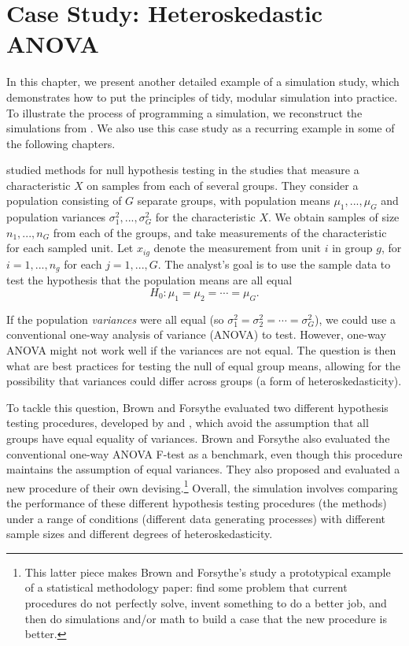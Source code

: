 \documentclass[
]{book}
\begin{document}
\chapter{Case Study: Heteroskedastic ANOVA}\label{case-ANOVA}

In this chapter, we present another detailed example of a simulation study, which demonstrates how to put the principles of tidy, modular simulation into practice.
To illustrate the process of programming a simulation, we reconstruct the simulations from \citet{brown1974SmallSampleBehavior}.
We also use this case study as a recurring example in some of the following chapters.

\citet{brown1974SmallSampleBehavior} studied methods for null hypothesis testing in the studies that measure a characteristic \(X\) on samples from each of several groups. They consider a population consisting of \(G\) separate groups, with population means \(\mu_1,...,\mu_G\) and population variances \(\sigma_1^2,...,\sigma_G^2\) for the characteristic \(X\).
We obtain samples of size \(n_1,...,n_G\) from each of the groups, and take measurements of the characteristic for each sampled unit.
Let \(x_{ig}\) denote the measurement from unit \(i\) in group \(g\), for \(i = 1,...,n_g\) for each \(j = 1,..., G\).
The analyst's goal is to use the sample data to test the hypothesis that the population means are all equal
\[
H_0: \mu_1 = \mu_2 = \cdots = \mu_G.
\]

If the population \emph{variances} were all equal (so \(\sigma_1^2 = \sigma_2^2 = \cdots = \sigma_G^2\)), we could use a conventional one-way analysis of variance (ANOVA) to test.
However, one-way ANOVA might not work well if the variances are not equal.
The question is then what are best practices for testing the null of equal group means, allowing for the possibility that variances could differ across groups (a form of heteroskedasticity).

To tackle this question, Brown and Forsythe evaluated two different hypothesis testing procedures, developed by \citet{james1951ComparisonSeveralGroups} and \citet{welch1951ComparisonSeveralMean}, which avoid the assumption that all groups have equal equality of variances.
Brown and Forsythe also evaluated the conventional one-way ANOVA F-test as a benchmark, even though this procedure maintains the assumption of equal variances.
They also proposed and evaluated a new procedure of their own devising.\footnote{This latter piece makes Brown and Forsythe's study a prototypical example of a statistical methodology paper: find some problem that current procedures do not perfectly solve, invent something to do a better job, and then do simulations and/or math to build a case that the new procedure is better.}
Overall, the simulation involves comparing the performance of these different hypothesis testing procedures (the methods) under a range of conditions (different data generating processes) with different sample sizes and different degrees of heteroskedasticity.
\end{document}
